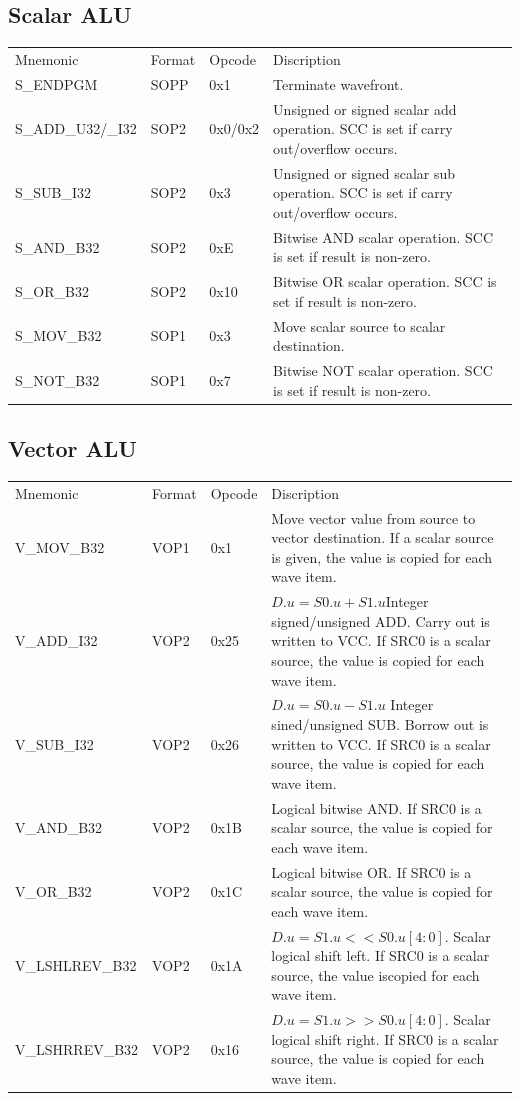 \documentclass{article}
\begin{document}
\subsection{Scalar ALU}
\begin{tabular}{l l l p{4.5in}}
Mnemonic & Format & Opcode & Discription \\ 
S\_ENDPGM & SOPP & 0x1 & Terminate wavefront. \\
S\_ADD\_U32/\_I32 & SOP2 & 0x0/0x2 & Unsigned or signed scalar add operation. SCC is set if carry out/overflow occurs. \\ 
S\_SUB\_I32 & SOP2 & 0x3 & Unsigned or signed scalar sub operation. SCC is set if carry out/overflow occurs. \\ 
S\_AND\_B32 & SOP2 & 0xE & Bitwise AND scalar operation. SCC is set if result is non-zero.\\
S\_OR\_B32 & SOP2 & 0x10 & Bitwise OR scalar operation. SCC is set if result is non-zero. \\
S\_MOV\_B32 & SOP1 & 0x3 & Move scalar source to scalar destination. \\
S\_NOT\_B32 & SOP1 & 0x7 & Bitwise NOT scalar operation. SCC is set if result is non-zero. \\
\end{tabular}

\subsection{Vector ALU}
\begin{tabular}{l l l p{4.5in}}
Mnemonic & Format & Opcode & Discription \\
V\_MOV\_B32 & VOP1 & 0x1 & Move vector value from source to vector destination. If a scalar source is given, the value is copied for each wave item. \\
V\_ADD\_I32 & VOP2 & 0x25 & \(D.u = S0.u + S1.u\)Integer signed/unsigned ADD. Carry out is written to VCC. If SRC0 is a scalar source, the value is copied for each wave item.  \\
V\_SUB\_I32 & VOP2 & 0x26 & \(D.u = S0.u - S1.u\) Integer sined/unsigned SUB. Borrow out is written to VCC. If SRC0 is a scalar source, the value is copied for each wave item. \\
V\_AND\_B32 & VOP2 & 0x1B & Logical bitwise AND. If SRC0 is a scalar source, the value is copied for each wave item.  \\
V\_OR\_B32 & VOP2 & 0x1C & Logical bitwise OR. If SRC0 is a scalar source, the value is copied for each wave item.  \\
V\_LSHLREV\_B32 & VOP2 & 0x1A & \(D.u = S1.u << S0.u[4:0]\). Scalar logical shift left. If SRC0 is a scalar source, the value iscopied for each wave item.  \\
V\_LSHRREV\_B32 & VOP2 & 0x16 & \(D.u = S1.u >> S0.u[4:0]\). Scalar logical shift right. If SRC0 is a scalar source, the value is copied for each wave item.\\
\end{tabular}
\end{document}
